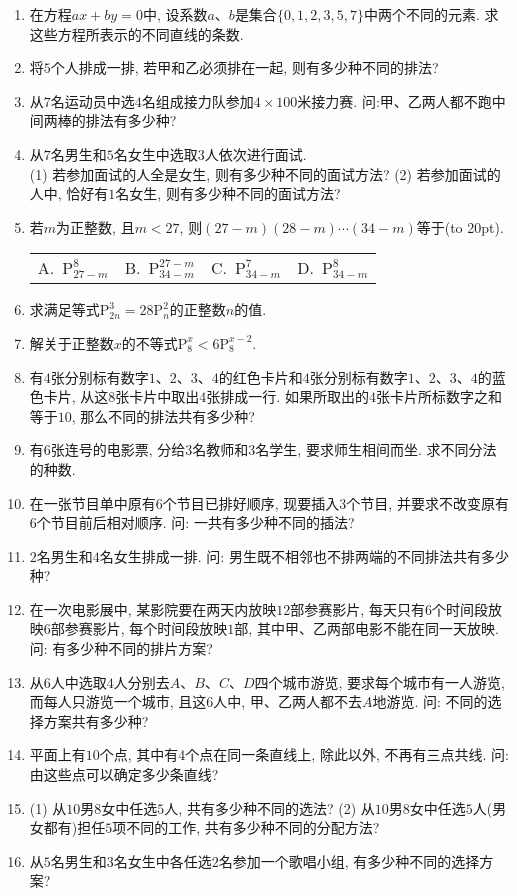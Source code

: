 \documentclass[10pt,a4paper]{article}
\newcommand{\bracket}[1]{(\hbox to #1pt{})}
\newcommand{\fourch}[4]{\par\begin{tabular}{p{.23\textwidth}p{.23\textwidth}p{.23\textwidth}p{.23\textwidth}}
A.~#1 &B.~#2& C.~#3& D.~#4
\end{tabular}}
\begin{document}
\begin{enumerate}[1.]
\item 在方程$ax+by=0$中, 设系数$a$、$b$是集合$\{0, 1, 2, 3, 5, 7\}$中两个不同的元素. 求这些方程所表示的不同直线的条数.
\item 将$5$个人排成一排, 若甲和乙必须排在一起, 则有多少种不同的排法? 
\item 从$7$名运动员中选$4$名组成接力队参加$4\times 100$米接力赛. 问:甲、乙两人都不跑中间两棒的排法有多少种? 
\item 从$7$名男生和$5$名女生中选取$3$人依次进行面试.\\
(1) 若参加面试的人全是女生, 则有多少种不同的面试方法?
(2) 若参加面试的人中, 恰好有$1$名女生, 则有多少种不同的面试方法? 
\item 若$m$为正整数, 且$m<27$, 则$(27-m)(28-m)\cdots(34-m)$等于\bracket{20}.
\fourch{$\mathrm{P}_{27-m}^8$}{$\mathrm{P}_{34-m}^{27-m}$}{$\mathrm{P}_{34-m}^7$}{$\mathrm{P}_{34-m}^8$}
\item 求满足等式$\mathrm{P}_{2n}^3=28\mathrm{P}_n^2$的正整数$n$的值.
\item 解关于正整数$x$的不等式$\mathrm{P}_8^x<6\mathrm{P}_8^{x-2}$.
\item 有$4$张分别标有数字$1$、$2$、$3$、$4$的红色卡片和$4$张分别标有数字$1$、$2$、$3$、$4$的蓝色卡片, 从这$8$张卡片中取出$4$张排成一行. 如果所取出的$4$张卡片所标数字之和等于$10$, 那么不同的排法共有多少种? 
\item 有$6$张连号的电影票, 分给$3$名教师和$3$名学生, 要求师生相间而坐. 求不同分法的种数.
\item 在一张节目单中原有$6$个节目已排好顺序, 现要插入$3$个节目, 并要求不改变原有$6$个节目前后相对顺序. 问: 一共有多少种不同的插法?
\item $2$名男生和$4$名女生排成一排. 问: 男生既不相邻也不排两端的不同排法共有多少种? 
\item 在一次电影展中, 某影院要在两天内放映$12$部参赛影片, 每天只有$6$个时间段放映$6$部参赛影片, 每个时间段放映$1$部, 其中甲、乙两部电影不能在同一天放映. 问: 有多少种不同的排片方案? 
\item 从$6$人中选取$4$人分别去$A$、$B$、$C$、$D$四个城市游览, 要求每个城市有一人游览, 而每人只游览一个城市, 且这$6$人中, 甲、乙两人都不去$A$地游览. 问: 不同的选择方案共有多少种? 
\item 平面上有$10$个点, 其中有$4$个点在同一条直线上, 除此以外, 不再有三点共线. 问: 由这些点可以确定多少条直线? 
\item (1) 从$10$男$8$女中任选$5$人, 共有多少种不同的选法?
(2) 从$10$男$8$女中任选$5$人(男女都有)担任$5$项不同的工作, 共有多少种不同的分配方法? 
\item 从$5$名男生和$3$名女生中各任选$2$名参加一个歌唱小组, 有多少种不同的选择方案? 

\end{enumerate}
\end{document}
